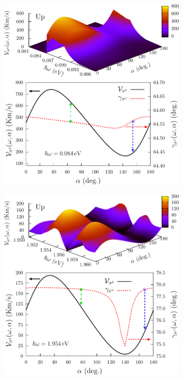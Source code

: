 \documentclass{beamer}
\begin{document}
    


\begin{frame}

\begin{center}
\includegraphics[width=0.7\textwidth]{figs/fig4.pdf}
\end{center}  

\end{frame}


\begin{frame}

\begin{center}
\includegraphics[width=0.7\textwidth]{figs/fig5.pdf}
\end{center}  

\end{frame}
\end{document}
